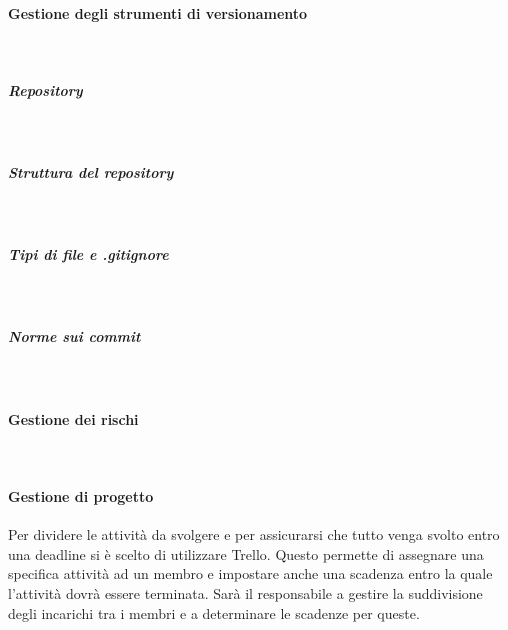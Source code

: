			\paragraph{Gestione degli strumenti di versionamento} \mbox{}\\
			\subparagraph{Repository} \mbox{}\\
			\subparagraph{Struttura del repository} \mbox{}\\
			\subparagraph{Tipi di file e .gitignore} \mbox{}\\
			\subparagraph{Norme sui commit} \mbox{}\\
			\paragraph{Gestione dei rischi} \mbox{}\\
			\paragraph{Gestione di progetto}
			Per dividere le attività da svolgere e per assicurarsi che tutto venga svolto entro una deadline si è scelto di utilizzare Trello. Questo permette di assegnare una specifica attività ad un membro e impostare anche una scadenza entro la quale l'attività dovrà essere terminata. Sarà il responsabile a gestire la suddivisione degli incarichi tra i membri e a determinare le scadenze per queste.
